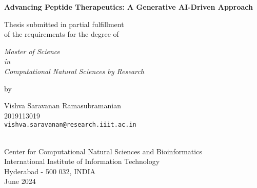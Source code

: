 \thispagestyle{empty}
\begin{center}
\vspace*{1.5cm}
{\Large \bf Advancing Peptide Therapeutics: A Generative AI-Driven Approach}

\vspace*{3.75cm}
{\large Thesis submitted in partial fulfillment\\}
{\large  of the requirements for the degree of \\}

\vspace*{1cm}
{\it {\large Master of Science} \\
{\large in\\}
{\large Computational Natural Sciences by Research \\}}

\vspace*{1cm}
{\large by}

\vspace*{5mm}
{\large Vishva Saravanan Ramasubramanian\\}
{\large 2019113019\\
{\small \tt vishva.saravanan@research.iiit.ac.in}}

\vspace*{4.0cm}
{\\}
{\large Center for Computational Natural Sciences and Bioinformatics\\}
{\large International Institute of Information Technology\\}
{\large Hyderabad - 500 032, INDIA\\}
{\large June 2024\\}
\end{center}
